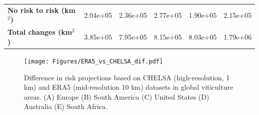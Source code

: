 \begin{table}[H]
{\begin{tabular}{lccccc}
            \textbf{No risk to risk (km$^2$)}    & 2.04e+05
                                                 & 2.36e+05
                                                 & 2.77e+05
                                                 & 1.90e+05
                                                 & 2.15e+05
            \\
            \textbf{Total changes (km$^2$)}      & 3.85e+05
                                                 & 7.95e+05
                                                 & 8.15e+05
                                                 & 8.03e+05
                                                 & 1.79e+06
            \\ \hline
        \end{tabular}
    }
\end{table}

\begin{figure}[H]
    \centering
    \texttt{[image: Figures/ERA5\_vs\_CHELSA\_dif.pdf]}
    \caption[Difference in risk projections due to the climate data resolution
        in global viticulture areas]{Difference in risk projections based on
        CHELSA
        (high-resolution, 1 km) and ERA5 (mid-resolution 10 km) datasets in
        global
        viticulture areas. (A) Europe (B) South America (C) United States (D)
        Australia
        (E) South Africa.}
    \label{fig:risk_indices_dif}
\end{figure}

